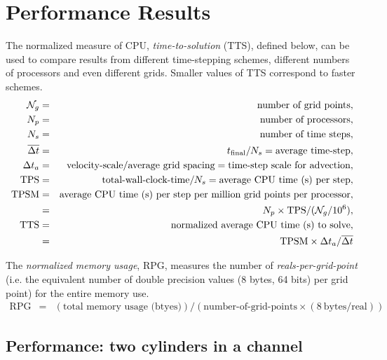 \newcommand{\dtBar}{\overline{\dt}}
\section{Performance Results}\label{sec:performanceResults}

The normalized measure of CPU,  {\em time-to-solution} (TTS), defined below,
can be used to compare results from different time-stepping schemes, different numbers of processors and even different grids. 
Smaller values of TTS correspond to faster schemes. 
\begin{eqnarray*}
 \Nc_g &=& \mbox{number of grid points}, \\
  N_p &=& \mbox{number of processors}, \\
  N_s &=& \mbox{number of time steps}, \\
  \dtBar  &=& t_{\rm final}/N_s =  \mbox{average time-step}, \\
  \dt_a  &=& \mbox{velocity-scale}/\mbox{average grid spacing} = \mbox{time-step scale for advection}, \\
 \mbox{TPS} &=& \mbox{total-wall-clock-time}/N_s = \mbox{average CPU time (s) per step}, \\
 \mbox{TPSM} &=& \mbox{average CPU time (s) per step per million grid points per processor}, \\
              &=& N_p \times \mbox{TPS}/( \Nc_g/10^6) , \\
 \mbox{TTS} &=&  \mbox{normalized average CPU time (s) to solve}, \\
            &=& \mbox{TPSM} \times \dt_a/\dtBar
\end{eqnarray*}


The {\em normalized memory usage},  RPG, measures the number of {\em reals-per-grid-point} (i.e. the equivalent 
number of double precision values (8 bytes, 64 bits) per grid point) for the entire memory use. 
\begin{eqnarray*}
 \mbox{RPG} &=& (\mbox{total memory usage (btyes)})/(\mbox{number-of-grid-points} \times (8~\mbox{bytes/real}))
\end{eqnarray*}

\subsection{Performance: two cylinders in a channel} \label{sec:performanceTwoCylinders}

